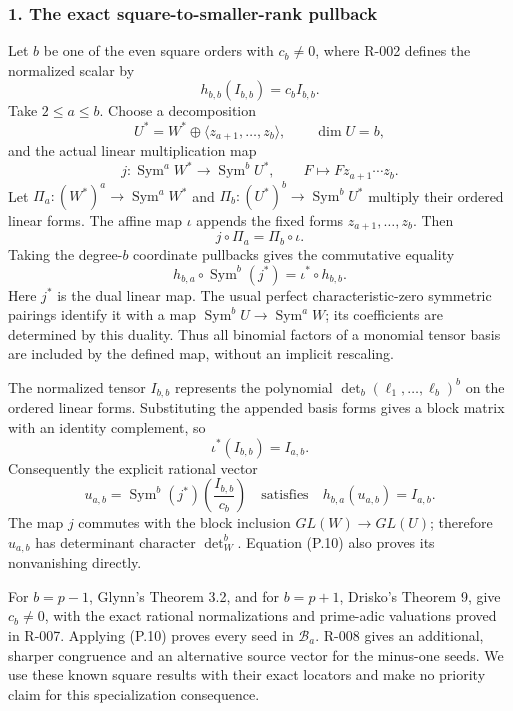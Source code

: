 \documentclass[
  10pt,
]{article}
\begin{document}
\subsubsection{1. The exact square-to-smaller-rank
pullback}\label{the-exact-square-to-smaller-rank-pullback}

Let \(b\) be one of the even square orders with \(c_b\ne0\), where R-002
defines the normalized scalar by \[
 h_{b,b}(I_{b,b})=c_b I_{b,b}.
\tag{P.5}
\] Take \(2\le a\le b\). Choose a decomposition \[
 U^*=W^*\oplus\langle z_{a+1},\ldots,z_b\rangle,\qquad \dim U=b,
\] and the actual linear multiplication map \[
 j:\operatorname{Sym}^a W^*\longrightarrow\operatorname{Sym}^b U^*,
 \qquad F\longmapsto Fz_{a+1}\cdots z_b.
\tag{P.6}
\] Let \(\Pi_a:(W^*)^a\to\operatorname{Sym}^a W^*\) and
\(\Pi_b:(U^*)^b\to\operatorname{Sym}^b U^*\) multiply their ordered
linear forms. The affine map \(\iota\) appends the fixed forms
\(z_{a+1},\ldots,z_b\). Then \[
 j\circ\Pi_a=\Pi_b\circ\iota.
\tag{P.7}
\] Taking the degree-\(b\) coordinate pullbacks gives the commutative
equality \[
 h_{b,a}\circ\operatorname{Sym}^b(j^*)
 =\iota^*\circ h_{b,b}.
\tag{P.8}
\] Here \(j^*\) is the dual linear map. The usual perfect
characteristic-zero symmetric pairings identify it with a map
\(\operatorname{Sym}^b U\to\operatorname{Sym}^a W\); its coefficients
are determined by this duality. Thus all binomial factors of a monomial
tensor basis are included by the defined map, without an implicit
rescaling.

The normalized tensor \(I_{b,b}\) represents the polynomial
\(\det_b(\ell_1,\ldots,\ell_b)^b\) on the ordered linear forms.
Substituting the appended basis forms gives a block matrix with an
identity complement, so \[
 \iota^*(I_{b,b})=I_{a,b}.
\tag{P.9}
\] Consequently the explicit rational vector \[
 u_{a,b}=\operatorname{Sym}^b(j^*)\left(\frac{I_{b,b}}{c_b}\right)
 \quad\text{satisfies}\quad h_{b,a}(u_{a,b})=I_{a,b}.
\tag{P.10}
\] The map \(j\) commutes with the block inclusion \(GL(W)\to GL(U)\);
therefore \(u_{a,b}\) has determinant character \(\det_W^b\). Equation
(P.10) also proves its nonvanishing directly.

For \(b=p-1\), Glynn's Theorem 3.2, and for \(b=p+1\), Drisko's Theorem
9, give \(c_b\ne0\), with the exact rational normalizations and
prime-adic valuations proved in R-007. Applying (P.10) proves every seed
in \(\mathcal B_a\). R-008 gives an additional, sharper congruence and
an alternative source vector for the minus-one seeds. We use these known
square results with their exact locators and make no priority claim for
this specialization consequence.
\end{document}
